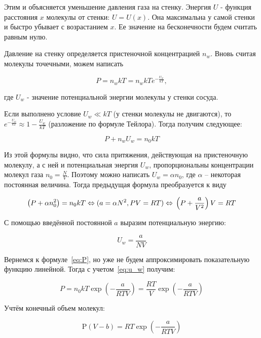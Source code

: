 \documentclass[a4paper, 14pt]{article}
\begin{document}
    Этим и объясняется уменьшение давления газа на стенку.
    Энергия $U$ - функция расстояния $x$ молекулы от стенки: $U = U(x)$.
    Она максимальна у самой стенки и быстро убывает с возрастанием $x$.
    Ее значение на бесконечности будем считать равным нулю.

    Давление на стенку определяется пристеночной концентрацией $n_w$.
    Вновь считая молекулы точечными, можем написать

    \begin{equation}
        \label{eq:P}
        P = n_w kT = n_w kT e^{-\frac{U_w}{kT}},
    \end{equation}

    где $U_{w}$ - значение потенциальной энергии молекулы у стенки сосуда.

    Если выполнено условие $U_w \ll kT$ (у стенки молекулы не двигаются), то $e^{-\frac{U_w}{kT}} \approx 1 -
    \frac{U_w}{kT}$ (разложение по формуле Тейлора).
    Тогда получим следующее:

    \[ P + n_w U_w = n_0 kT \]

    Из этой формулы видно, что сила притяжения, действующая на пристеночную молекулу, а с ней и потенциальная энергия $
    U_w$, пропорциональны концентрации молекул газа $n_0 = \frac{N}{V}$.
    Поэтому можно написать $U_w = \alpha n_0$, где $\alpha$ -- некоторая постоянная величина.
    Тогда предыдущая формула преобразуется к виду

    \[  \left(P + \alpha n_0^{2} \right) = n_0 kT \\
    \Leftrightarrow (a = \alpha N^2, PV = RT) \Leftrightarrow \\
    \left(P+\frac{a}{V^{2}}\right)V = RT                        \]

    С помощью введённой постоянной $a$ выразим потенциальную энергию:

    \begin{equation}
        \label{eq:u_w}
        U_w = \frac{a}{NV}
    \end{equation}

    Вернемся к формуле~\eqref{eq:P}, но уже не будем аппроксимировать показательную функцию линейной.
    Тогда с учетом~\eqref{eq:u_w} получим:

    \[ P = n_0 kT \exp \left( -\frac{a}{RTV} \right) = \frac{RT}{V} \exp \left( -\frac{a}{RTV} \right) \]

    Учтём конечный объем молекул:

    \[ \mathrm{P}(V - b) = RT \exp \left( -\frac{a}{RTV} \right) \]
\end{document}
